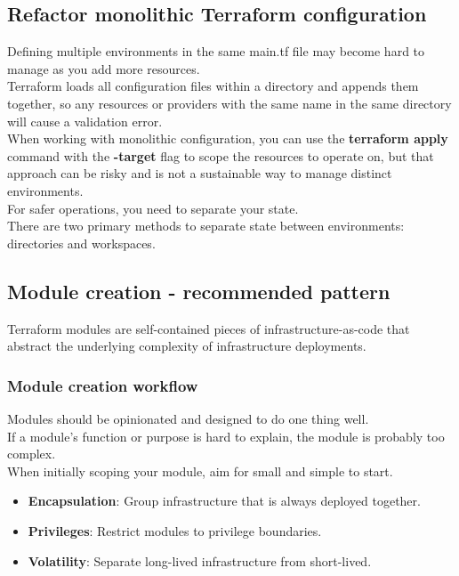 \documentclass[12pt, letterpaper, twoside]{article}
\begin{document}
\subsection{Refactor monolithic Terraform configuration}
Defining multiple environments in the same main.tf file may become hard to manage 
as you add more resources.\\
Terraform loads all configuration files within a directory and appends them together, 
so any resources or providers with the same name in the same directory will cause 
a validation error.\\
When working with monolithic configuration, you can use the \textbf{terraform apply} 
command with the \textbf{-target} flag to scope the resources to operate on, but 
that approach can be risky and is not a sustainable way to manage distinct environments.\\
For safer operations, you need to separate your state.\\
There are two primary methods to separate state between environments: directories and workspaces.

\subsection{Module creation - recommended pattern}
Terraform modules are self-contained pieces of infrastructure-as-code that abstract the 
underlying complexity of infrastructure deployments.

\subsubsection{Module creation workflow}
Modules should be opinionated and designed to do one thing well.\\
If a module's function or purpose is hard to explain, the module is probably too complex.\\
When initially scoping your module, aim for small and simple to start.\\
\begin{itemize}
    \item\textbf{Encapsulation}: Group infrastructure that is always deployed together. 
    \item \textbf{Privileges}: Restrict modules to privilege boundaries.
    \item \textbf{Volatility}: Separate long-lived infrastructure from short-lived.
\end{itemize}
\end{document}

